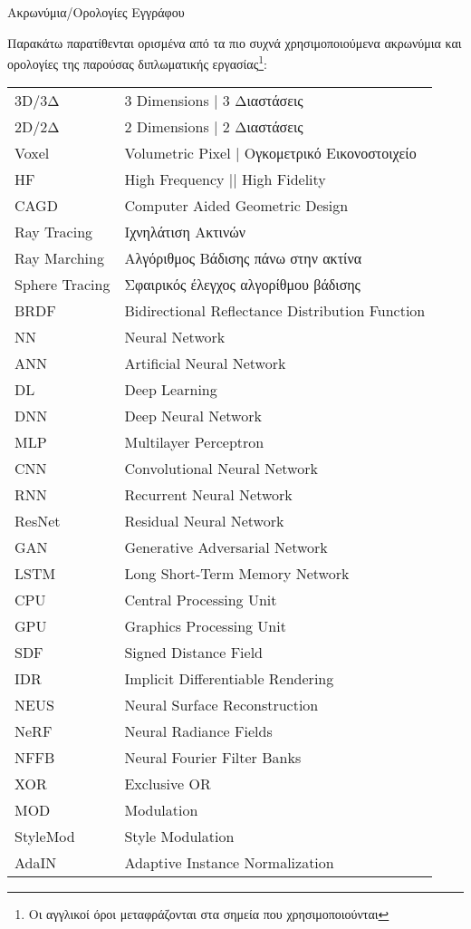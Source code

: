 {\centering\LARGE Ακρωνύμια/Ορολογίες Εγγράφου\par}
\vspace{1em}
\label{append:acronyms}
\thispagestyle{empty}
Παρακάτω παρατίθενται ορισμένα από τα πιο συχνά χρησιμοποιούμενα ακρωνύμια και ορολογίες της παρούσας διπλωματικής εργασίας\footnote{Οι αγγλικοί όροι μεταφράζονται στα σημεία που χρησιμοποιούνται}:
\begin{table}[htpb]
  \centering
  \begin{tabularx}{\textwidth}{l@{$\;\;\longrightarrow\;\;$}X}
    3D/3Δ & 3 Dimensions | 3 Διαστάσεις\\
    2D/2Δ & 2 Dimensions | 2 Διαστάσεις \\
    Voxel & Volumetric Pixel | Ογκομετρικό Εικονοστοιχείο \\
    HF & High Frequency || High Fidelity \\
    \addlinespace
    CAGD & Computer Aided Geometric Design \\
    Ray Tracing & Ιχνηλάτιση Ακτινών \\
    Ray Marching & Αλγόριθμος Βάδισης πάνω στην ακτίνα \\
    Sphere Tracing & Σφαιρικός έλεγχος αλγορίθμου βάδισης \\
    BRDF & Bidirectional Reflectance Distribution Function \\
    \addlinespace
    NN & Neural Network \\
    ANN & Artificial Neural Network \\
    DL & Deep Learning \\
    DNN & Deep Neural Network \\
    MLP & Multilayer Perceptron \\
    CNN & Convolutional Neural Network \\
    RNN & Recurrent Neural Network \\
    ResNet & Residual Neural Network \\
    \addlinespace
    GAN & Generative Adversarial Network \\
    LSTM & Long Short-Term Memory Network \\
    CPU & Central Processing Unit \\
    GPU & Graphics Processing Unit \\
    \addlinespace
    SDF & Signed Distance Field \\
    IDR & Implicit Differentiable Rendering \\
    NEUS & Neural Surface Reconstruction \\
    NeRF & Neural Radiance Fields \\
    \addlinespace
    NFFB & Neural Fourier Filter Banks \\
    XOR & Exclusive OR \\
    MOD & Modulation \\
    StyleMod & Style Modulation \\
    AdaIN & Adaptive Instance Normalization \\
  \end{tabularx}
\end{table}
